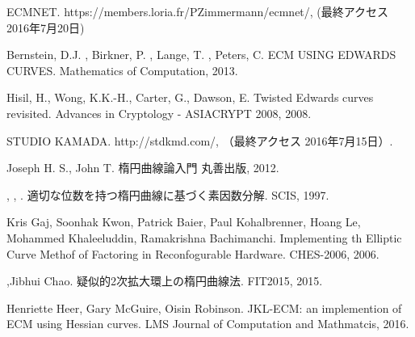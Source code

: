 \documentclass[openany,11pt,papersize]{jsbook}
\begin{document}

\begin{thebibliography}{9}

\newblock ECMNET.
\newblock https://members.loria.fr/PZimmermann/ecmnet/, (最終アクセス 2016年7月20日)

\newblock Bernstein, D.J. , Birkner, P. , Lange, T. , Peters, C.
\newblock ECM USING EDWARDS CURVES.
\newblock Mathematics of Computation, 2013.

\newblock Hisil, H., Wong, K.K.-H., Carter, G., Dawson, E.
\newblock Twisted Edwards curves revisited.
\newblock Advances in Cryptology - ASIACRYPT 2008, 2008.

\newblock STUDIO KAMADA. 
\newblock http://stdkmd.com/, （最終アクセス 2016年7月15日）.

\newblock Joseph H. S., John T.
\newblock 楕円曲線論入門
\newblock 丸善出版, 2012.

{}{},
 {}{},
 {}{}.
\newblock 適切な位数を持つ楕円曲線に基づく素因数分解.
\newblock SCIS, 1997.


\newblock Kris Gaj, Soonhak Kwon, Patrick Baier, Paul Kohalbrenner, Hoang Le, Mohammed Khaleeluddin, Ramakrishna Bachimanchi.
\newblock Implementing th Elliptic Curve Methof of Factoring in Reconfogurable Hardware.
\newblock CHES-2006, 2006.

,Jibhui Chao.
\newblock 疑似的2次拡大環上の楕円曲線法.
\newblock FIT2015, 2015.

\newblock Henriette Heer, Gary McGuire, Oisin Robinson.
\newblock JKL-ECM: an implemention of ECM using Hessian curves.
\newblock LMS Journal of Computation and Mathmatcis, 2016.

\end{thebibliography}
\end{document}
